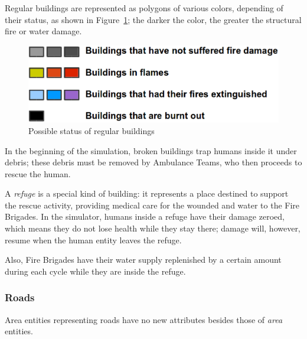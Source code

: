 \documentclass{article}
\begin{document}
Regular buildings are represented as polygons of various colors, depending of their status, as shown in Figure~\ref{fig:building_status}; the darker the color, the greater the structural fire or water damage.
\begin{figure}[ht]
  \centering
  \includegraphics[width=1.0\textwidth]{figs/building_status.eps}
  \caption{Possible status of regular buildings}
  \label{fig:building_status}
\end{figure}

In the beginning of the simulation, broken buildings trap humans inside it under debris; these debris must be removed by Ambulance Teams, who then proceeds to rescue the human.

A \emph{refuge} is a special kind of building: it represents a place destined to support the rescue activity, providing medical care for the wounded and water to the Fire Brigades. In the simulator, humans inside a refuge have their damage zeroed, which means they do not lose health while they stay there; damage will, however, resume when the human entity leaves the refuge.

Also, Fire Brigades have their water supply replenished by a certain amount during each cycle while they are inside the refuge.
\subsubsection{Roads}
Area entities representing roads have no new attributes besides those of \emph{area} entities.
\end{document}
